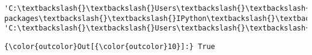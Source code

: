 \documentclass[11pt]{article}
\begin{document}
\begin{Verbatim}[commandchars=\\\{\}]
'C:\textbackslash{}\textbackslash{}Users\textbackslash{}\textbackslash{}sandr\textbackslash{}\textbackslash{}AppData\textbackslash{}\textbackslash{}Local\textbackslash{}\textbackslash{}conda\textbackslash{}\textbackslash{}conda\textbackslash{}\textbackslash{}envs\textbackslash{}\textbackslash{}tensorflowenvironment\textbackslash{}\textbackslash{}lib\textbackslash{}\textbackslash{}site-packages\textbackslash{}\textbackslash{}IPython\textbackslash{}\textbackslash{}extensions', 'C:\textbackslash{}\textbackslash{}Users\textbackslash{}\textbackslash{}sandr\textbackslash{}\textbackslash{}.ipython']

    \end{Verbatim}

\begin{Verbatim}[commandchars=\\\{\}]
{\color{outcolor}Out[{\color{outcolor}10}]:} True
\end{Verbatim}
            
\end{document}
